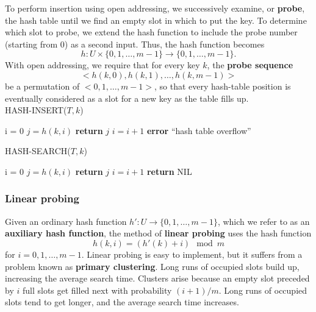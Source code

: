 \documentclass[12pt]{article}
\begin{document}
To perform insertion using open addressing, we successively examine, or \textbf {probe}, the hash table until we find an empty slot in which to put the key. To determine which slot to probe, we extend the hash function to include the probe number (starting from 0) as a second input. Thus, the hash function becomes
\begin{equation*}
  h: U \times \{ 0,1,\dots,m-1 \} \rightarrow \{ 0,1,\dots,m-1 \}.
\end{equation*}
With open addressing, we require that for every key $k$, the \textbf {probe sequence}
\begin{equation*}
  <h(k,0), h(k,1), \dots, h(k, m-1)>
\end{equation*}
be a permutation of $<0,1,\dots,m-1>$, so that every hash-table position is eventually considered as a slot for a new key as the table fills up. \\

HASH-INSERT($T, k$)
\begin{algorithmic}[1]
\State i = 0
\Repeat
	\State $j = h(k,i)$
                \State \textbf {return} $j$
        \Else
        	\State $i = i + 1$
        \EndIf
{}
\State \textbf {error} ``hash table overflow''
\end{algorithmic}

HASH-SEARCH($T, k$)
\begin{algorithmic}[1]
\State i = 0
\Repeat
	\State $j = h(k,i)$
                \State \textbf {return} $j$
        \EndIf
        \State $i = i + 1$
\State \textbf {return} NIL
\end{algorithmic}

\subsubsection*{Linear probing}

Given an ordinary hash function $h': U \rightarrow \{ 0,1,\dots,m-1 \}$, which we refer to as an \textbf {auxiliary hash function}, the method of \textbf {linear probing} uses the hash function
\begin{equation*}
  h(k,i) = (h'(k) + i) \mod m
\end{equation*}
for $i = 0,1,\dots,m-1$. Linear probing is easy to implement, but it suffers from a problem known as \textbf {primary clustering}. Long runs of occupied slots build up, increasing the average search time. Clusters arise because an empty slot preceded by $i$ full slots get filled next with probability $(i+1)/m$. Long runs of occupied slots tend to get longer, and the average search time increases.
\end{document}

